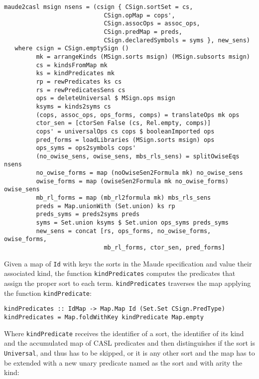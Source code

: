 {\codesize
\begin{verbatim}
maude2casl msign nsens = (csign { CSign.sortSet = cs,
                            CSign.opMap = cops',
                            CSign.assocOps = assoc_ops,
                            CSign.predMap = preds,
                            CSign.declaredSymbols = syms }, new_sens)
   where csign = CSign.emptySign ()
         mk = arrangeKinds (MSign.sorts msign) (MSign.subsorts msign)
         cs = kindsFromMap mk
         ks = kindPredicates mk
         rp = rewPredicates ks cs
         rs = rewPredicatesSens cs
         ops = deleteUniversal $ MSign.ops msign
         ksyms = kinds2syms cs
         (cops, assoc_ops, ops_forms, comps) = translateOps mk ops
         ctor_sen = [ctorSen False (cs, Rel.empty, comps)]
         cops' = universalOps cs cops $ booleanImported ops
         pred_forms = loadLibraries (MSign.sorts msign) ops
         ops_syms = ops2symbols cops'
         (no_owise_sens, owise_sens, mbs_rls_sens) = splitOwiseEqs nsens
         no_owise_forms = map (noOwiseSen2Formula mk) no_owise_sens
         owise_forms = map (owiseSen2Formula mk no_owise_forms) owise_sens
         mb_rl_forms = map (mb_rl2formula mk) mbs_rls_sens
         preds = Map.unionWith (Set.union) ks rp
         preds_syms = preds2syms preds
         syms = Set.union ksyms $ Set.union ops_syms preds_syms
         new_sens = concat [rs, ops_forms, no_owise_forms, owise_forms,
                            mb_rl_forms, ctor_sen, pred_forms]
\end{verbatim}
}

Given a map of \verb"Id" with keys the sorts in the Maude specification and
value their associated kind, the function \verb"kindPredicates" computes
the predicates that assign the proper sort to each term.
\verb"kindPredicates" traverses the map applying the function
\verb"kindPredicate":

{\codesize
\begin{verbatim}
kindPredicates :: IdMap -> Map.Map Id (Set.Set CSign.PredType)
kindPredicates = Map.foldWithKey kindPredicate Map.empty
\end{verbatim}
}

Where \verb"kindPredicate" receives the identifier of a sort,
the identifier of its kind and the accumulated map of CASL predicates
and then distinguishes if the sort is \verb"Universal", and thus has to be
skipped, or it is any other sort and the map has to be extended with a
new unary predicate named as the sort and with arity the kind:

